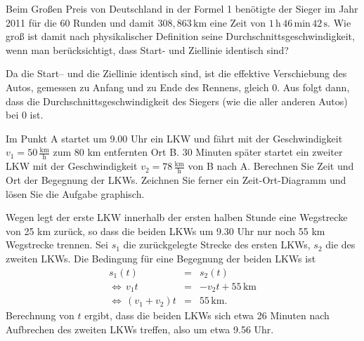 \begin{MExercises}

   \begin{MExercise}
   Beim Gro{\ss}en Preis von Deutschland in der Formel 1 ben\"otigte der Sieger im Jahr 2011 f\"ur die 60 Runden und damit ${308,863} \,\text{km}$ eine Zeit von $1\,\text{h}\,46\,\text{min}\,42\,\text{s}$. Wie gro{\ss} ist damit nach physikalischer Definition seine Durchschnittsgeschwindigkeit, wenn man ber\"ucksichtigt, dass Start- und Ziellinie identisch sind?
   
   
   \begin{MSolution}
   Da die Start-- und die Ziellinie identisch sind, ist die effektive Verschiebung des Autos, gemessen zu Anfang und zu Ende des Rennens, gleich $0$. Aus  folgt dann, dass die Durchschnittsgeschwindigkeit des Siegers (wie die aller anderen Autos) bei $0$ ist.
   \end{MSolution}
   \end{MExercise}
   
       \begin{MExercise}
       Im Punkt A startet um 9.00 Uhr ein LKW und f\"ahrt mit der Geschwindigkeit $v_1=50 \,\frac{\text{km}}{\text{h}}$ zum 80 km entfernten Ort B. 30 Minuten sp\"ater startet ein zweiter LKW mit der Geschwindigkeit $v_2=78 \,\frac{\text{km}}{\text{h}}$ von B nach A. Berechnen Sie Zeit und Ort der Begegnung der LKWs. Zeichnen Sie ferner ein Zeit-Ort-Diagramm und l\"osen Sie die Aufgabe graphisch. 
       
       \begin{MSolution}
       
       
       
       Wegen  legt der erste LKW innerhalb der ersten halben Stunde eine Wegstrecke von 25 km zur\"uck, so dass die beiden LKWs um 9.30 Uhr nur noch 55 km Wegstrecke trennen. Sei $s_1$ die zur\"uckgelegte Strecke des ersten LKWs, $s_2$ die des zweiten LKWs. Die Bedingung f\"ur eine Begegnung der beiden LKWs ist
       \begin{eqnarray*}
       s_1(t) &=& s_2(t)\\
       \Leftrightarrow\, v_1t&=&-v_2t+55\,\text{km}\\
       \Leftrightarrow\, (v_1+v_2)t&=&55\,\text{km}.       
       \end{eqnarray*} Berechnung von $t$ ergibt, dass die beiden LKWs sich etwa 26 Minuten nach Aufbrechen des zweiten LKWs treffen, also um etwa 9.56 Uhr.\\
       

\end{MSolution}
\end{MExercise}
\end{MExercises}
